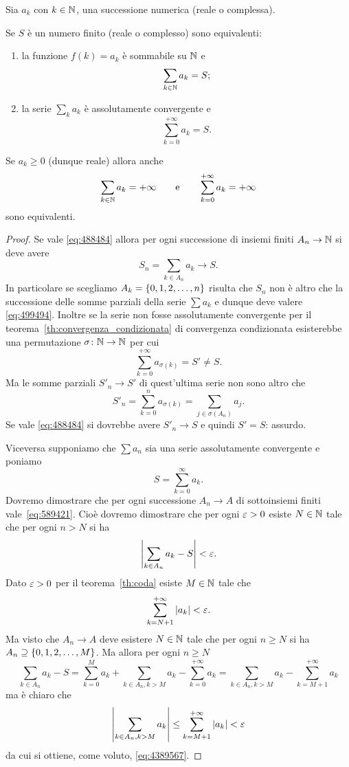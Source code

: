 \begin{theorem}
Sia $a_k$ con $k\in \mathbb N$, una successione numerica (reale o complessa).

Se $S$ è un numero finito (reale o complesso)
sono equivalenti:
\begin{enumerate}
  \item la funzione $f(k)=a_k$ è sommabile su $\mathbb N$ e
\begin{equation}\label{eq:488484}
  \sum_{k\in \mathbb N} a_k = S;
\end{equation}
\item la serie $\sum_k a_k$ è assolutamente
convergente e
\begin{equation}\label{eq:499494}
  \sum_{k=0}^{+\infty} a_k = S.
\end{equation}
\end{enumerate}

Se $a_k\ge 0$ (dunque reale) allora anche
\[
  \sum_{k\in \mathbb N} a_k = +\infty
\qquad
\text{e}
\qquad
\sum_{k=0}^{+\infty} a_k = +\infty
\]
sono equivalenti.
\end{theorem}
%
\begin{proof}
  Se vale \eqref{eq:488484} allora per ogni successione
  di insiemi finiti $A_n \to \mathbb N$ si deve avere
  \[
    S_n = \sum_{k\in A_n} a_k  \to S.
  \]
  In particolare se scegliamo $A_k={\left\{ 0,1,2, \dots, n \right\}}$
  risulta che $S_n$ non è altro che la successione delle somme parziali della serie $\sum a_k$ e dunque deve valere \eqref{eq:499494}.
  Inoltre se la serie non fosse assolutamente convergente
  per il teorema~\ref{th:convergenza_condizionata} di convergenza condizionata esisterebbe una permutazione $\sigma\colon \mathbb N \to \mathbb N$ per cui
  \[
    \sum_{k=0}^{+\infty} a_{\sigma(k)} = S' \neq S.
  \]
  Ma le somme parziali $S'_n\to S'$
  di quest'ultima serie non sono
  altro che
  \[
    S'_n = \sum_{k=0}^n a_{\sigma(k)}
    = \sum_{j\in \sigma(A_n)} a_j.
  \]
  Se vale \eqref{eq:488484} si dovrebbe avere $S'_n \to S$
  e quindi $S'=S$: assurdo.

  Viceversa supponiamo che $\sum a_n$ sia una serie assolutamente convergente e poniamo
  \[
    S = \sum_{k=0}^{\infty} a_k.
  \]
  Dovremo dimostrare che per ogni successione
  $A_n\to A$ di sottoinsiemi finiti vale~\eqref{eq:589421}.
  Cioè dovremo dimostrare che per ogni $\varepsilon>0$
  esiste $N\in \mathbb N$ tale che per ogni $n>N$ si ha
  \begin{equation}\label{eq:4389567}
    {\left|\sum_{k\in A_n} a_k - S\right|} < \varepsilon.
  \end{equation}
  Dato $\varepsilon>0$ per il teorema~\ref{th:coda} esiste $M\in \mathbb N$
  tale che
  \[
    \sum_{k=N+1}^{+\infty} {\left|a_k\right|} < \varepsilon.
  \]
  Ma visto che $A_n \to A$ deve esistere $N\in \mathbb N$
  tale che per ogni $n\ge N$ si ha $A_n \supseteq {\left\{ 0,1,2,\dots ,M \right\}}$.
  Ma allora per ogni $n\ge N$
  \[
    \sum_{k \in A_n} a_k - S = \sum_{k=0}^M a_k + \sum_{k\in A_n, k>M} a_k - \sum_{k=0}^{+\infty} a_k
    = \sum_{k\in A_n, k>M} a_k - \sum_{k=M+1}^{+\infty} a_k
  \]
  ma è chiaro che
  \[
    {\left|\sum_{k\in A_n, k>M} a_k\right|}
    \le \sum_{k=M+1}^{+\infty} {\left|a_k\right|} < \varepsilon
  \]
  da cui si ottiene, come voluto, \eqref{eq:4389567}.
\end{proof}

